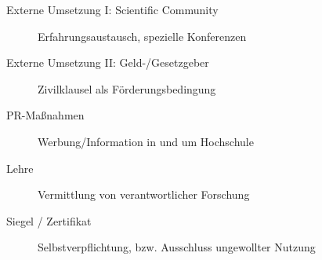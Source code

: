 \documentclass[presentation]{beamer}
\begin{document}
\begin{frame}
\begin{description}
\end{description}
\fontsize{8pt}{9.6}\selectfont
\begin{description}
\item[Externe Umsetzung I: Scientific Community] \tiny Erfahrungsaustausch, spezielle Konferenzen
\end{description}
\fontsize{8pt}{9.6}\selectfont
\begin{description}
\item[Externe Umsetzung II: Geld-/Gesetzgeber] \tiny Zivilklausel als Förderungsbedingung
\end{description}
\fontsize{8pt}{9.6}\selectfont
\begin{description}
\item[PR-Maßnahmen] \tiny Werbung/Information in und um Hochschule
\end{description}
\fontsize{8pt}{9.6}\selectfont
\begin{description}
\item[Lehre] \tiny Vermittlung von verantwortlicher Forschung
\end{description}
\fontsize{8pt}{9.6}\selectfont
\begin{description}
\item[Siegel / Zertifikat] \tiny Selbstverpflichtung, bzw. Ausschluss ungewollter Nutzung
\end{description}
  
\end{frame}
\end{document}
